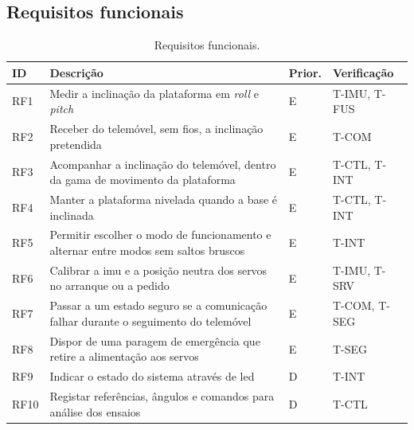 \subsection{Requisitos funcionais}
\begin{table}[H]
\centering\small
\caption{Requisitos funcionais.}
\begin{tabularx}{\textwidth}{p{1.1cm}Yp{1.2cm}p{2.2cm}}
\toprule
ID & Descrição & Prior. & Verificação\\\midrule
RF1 & Medir a inclinação da plataforma em \textit{roll} e \textit{pitch} & E & T-IMU, T-FUS\\
RF2 & Receber do telemóvel, sem fios, a inclinação pretendida & E & T-COM\\
RF3 & Acompanhar a inclinação do telemóvel, dentro da gama de movimento da plataforma & E & T-CTL, T-INT\\
RF4 & Manter a plataforma nivelada quando a base é inclinada & E & T-CTL, T-INT\\
RF5 & Permitir escolher o modo de funcionamento e alternar entre modos sem saltos bruscos & E & T-INT\\
RF6 & Calibrar a \gls{imu} e a posição neutra dos servos no arranque ou a pedido & E & T-IMU, T-SRV\\
RF7 & Passar a um estado seguro se a comunicação falhar durante o seguimento do telemóvel & E & T-COM, T-SEG\\
RF8 & Dispor de uma paragem de emergência que retire a alimentação aos servos & E & T-SEG\\
RF9 & Indicar o estado do sistema através de \gls{led} & D & T-INT\\
RF10 & Registar referências, ângulos e comandos para análise dos ensaios & D & T-CTL\\
\bottomrule
\end{tabularx}
\label{tab:rf}
\end{table}


